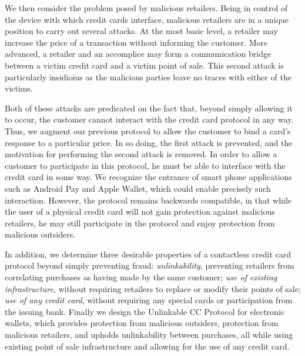 We then consider the problem posed by malicious retailers.
Being in control of the device with which credit cards interface, malicious retailers are in a unique position to carry out several attacks.
At the most basic level, a retailer may increase the price of a transaction without informing the customer.
More advanced, a retailer and an accomplice may form a communication bridge between a victim credit card and a victim point of sale.
This second attack is particularly insidioius as the malicious parties leave no traces with either of the victims.

Both of these attacks are predicated on the fact that, beyond simply allowing it to occur, the customer cannot interact with the credit card protocol in any way.
Thus, we augment our previous protocol to allow the customer to bind a card's response to a particular price.
In so doing, the first attack is prevented, and the motivation for performing the second attack is removed.
In order to allow a customer to participate in this protocol, he must be able to interface with the credit card in some way.
We recognize the entrance of smart phone applications such as Android Pay and Apple Wallet, which could enable precisely such interaction.
However, the protocol remains backwards compatible, in that while the user of a physical credit card will not gain protection against malicious retailers,
    he may still participate in the protocol and enjoy protection from malicious outsiders.

In addition, we determine three desirable properties of a contactless credit card protocol beyond simply preventing fraud:
    \emph{unlinkability}, preventing retailers from correlating purchases as having made by the same customer;
    \emph{use of existing infrastructure}, without requiring retailers to replace or modify their points of sale;
    \emph{use of any credit card}, without requiring any special cards or participation from the issuing bank.
Finally we design the Unlinkable CC Protocol for electronic wallets, which provides
    protection from malicious outsiders,
    protection from malicious retailers,
    and upholds unlinkability between purchases,
    all while using existing point of sale infrastructure and allowing for the use of any credit card.
